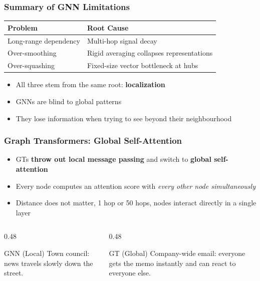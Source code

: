 \begin{frame}[fragile]\frametitle{Summary of GNN Limitations}

\begin{center}
\begin{tabular}{|l|l|}
\hline
\textbf{Problem} & \textbf{Root Cause} \\
\hline
Long-range dependency & Multi-hop signal decay \\
Over-smoothing & Rigid averaging collapses representations \\
Over-squashing & Fixed-size vector bottleneck at hubs \\
\hline
\end{tabular}
\end{center}

\vspace{0.5em}
\begin{itemize}
  \item All three stem from the same root: \textbf{localization}
  \item GNNs are blind to global patterns
  \item They lose information when trying to see beyond their neighbourhood
\end{itemize}

\end{frame}


\begin{frame}[fragile]\frametitle{Graph Transformers: Global Self-Attention}

\begin{itemize}
  \item GTs \textbf{throw out local message passing} and switch to \textbf{global self-attention}
  \item Every node computes an attention score with \emph{every other node simultaneously}
  \item Distance does not matter, 1 hop or 50 hops, nodes interact directly in a single layer
\end{itemize}

\vspace{0.5em}
\begin{columns}
  \begin{column}[T]{0.48\linewidth}
    \begin{block}{GNN (Local)}
      Town council: news travels slowly down the street.
    \end{block}
  \end{column}
  \begin{column}[T]{0.48\linewidth}
    \begin{block}{GT (Global)}
      Company-wide email: everyone gets the memo instantly and can react to everyone else.
    \end{block}
  \end{column}
\end{columns}

\end{frame}

